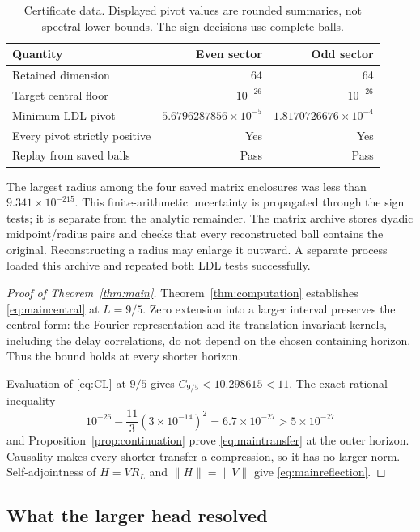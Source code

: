 \documentclass[11pt]{article}
\numberwithin{equation}{section}
\theoremstyle{definition}
\theoremstyle{remark}
\newcommand{\norm}[1]{\lVert#1\rVert}
\begin{document}
\begin{table}[ht]
\centering
\caption{Certificate data. Displayed pivot values are rounded summaries,
not spectral lower bounds. The sign decisions use complete balls.}
\label{tab:certificate}
\begin{tabular}{@{}lrr@{}}
\toprule
Quantity & Even sector & Odd sector\\
\midrule
Retained dimension & 64 & 64\\
Target central floor & $10^{-26}$ & $10^{-26}$\\
Minimum LDL pivot & $5.6796287856\times10^{-5}$ & $1.8170726676\times10^{-4}$\\
Every pivot strictly positive & Yes & Yes\\
Replay from saved balls & Pass & Pass\\
\bottomrule
\end{tabular}
\end{table}

The largest radius among the four saved matrix enclosures was less than
$9.341\times10^{-215}$. This finite-arithmetic uncertainty is propagated
through the sign tests; it is separate from the analytic remainder.
The matrix archive stores dyadic midpoint/radius pairs and checks that every
reconstructed ball contains the original. Reconstructing a radius may enlarge
it outward. A separate process loaded this archive and repeated both LDL
tests successfully.

\begin{proof}[Proof of Theorem~\ref{thm:main}]
Theorem~\ref{thm:computation} establishes \eqref{eq:maincentral} at $L=9/5$.
Zero extension into a larger interval preserves the central form: the
Fourier representation and its translation-invariant kernels, including
the delay correlations, do not depend on the chosen containing horizon.
Thus the bound holds at every shorter horizon.

Evaluation of \eqref{eq:CL} at $9/5$ gives $C_{9/5}<10.298615<11$.
The exact rational inequality
\[
 10^{-26}-\frac{11}{3}(3\times10^{-14})^2
 =6.7\times10^{-27}>5\times10^{-27}
\]
and Proposition~\ref{prop:continuation} prove \eqref{eq:maintransfer}
at the outer horizon. Causality makes every shorter transfer a compression,
so it has no larger norm. Self-adjointness of $H=VR_L$ and
$\norm H=\norm V$ give \eqref{eq:mainreflection}.
\end{proof}

\subsection{What the larger head resolved}
\end{document}
